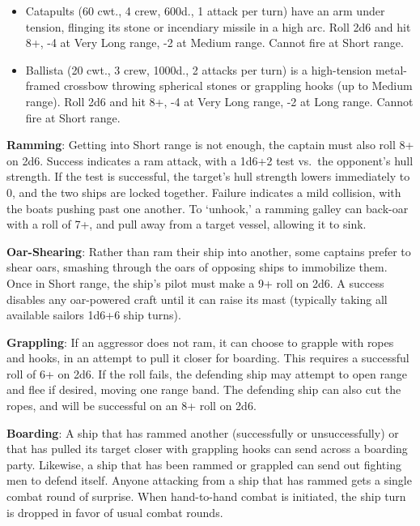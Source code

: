 \documentclass{book}
\providecommand{\tightlist}{%
\setlength{\itemsep}{0pt}\setlength{\parskip}{0pt}}
\begin{document}
\begin{itemize}
\tightlist
\item
  Catapults (60 cwt., 4 crew, 600d., 1 attack per turn) have an arm
  under tension, flinging its stone or incendiary missile in a high arc.
  Roll 2d6 and hit 8+, -4 at Very Long range, -2 at Medium range. Cannot
  fire at Short range.
\item
  Ballista (20 cwt., 3 crew, 1000d., 2 attacks per turn) is a
  high-tension metal-framed crossbow throwing spherical stones or
  grappling hooks (up to Medium range). Roll 2d6 and hit 8+, -4 at Very
  Long range, -2 at Long range. Cannot fire at Short range.
\end{itemize}

\textbf{Ramming}: Getting into Short range is not enough, the captain
must also roll 8+ on 2d6. Success indicates a ram attack, with a 1d6+2
test vs.~the opponent's hull strength. If the test is successful, the
target's hull strength lowers immediately to 0, and the two ships are
locked together. Failure indicates a mild collision, with the boats
pushing past one another. To `unhook,' a ramming galley can back-oar
with a roll of 7+, and pull away from a target vessel, allowing it to
sink.

\textbf{Oar-Shearing}: Rather than ram their ship into another, some
captains prefer to shear oars, smashing through the oars of opposing
ships to immobilize them. Once in Short range, the ship's pilot must
make a 9+ roll on 2d6. A success disables any oar-powered craft until it
can raise its mast (typically taking all available sailors 1d6+6 ship
turns).

\textbf{Grappling}: If an aggressor does not ram, it can choose to
grapple with ropes and hooks, in an attempt to pull it closer for
boarding. This requires a successful roll of 6+ on 2d6. If the roll
fails, the defending ship may attempt to open range and flee if desired,
moving one range band. The defending ship can also cut the ropes, and
will be successful on an 8+ roll on 2d6.

\textbf{Boarding}: A ship that has rammed another (successfully or
unsuccessfully) or that has pulled its target closer with grappling
hooks can send across a boarding party. Likewise, a ship that has been
rammed or grappled can send out fighting men to defend itself. Anyone
attacking from a ship that has rammed gets a single combat round of
surprise. When hand-to-hand combat is initiated, the ship turn is
dropped in favor of usual combat rounds.
\end{document}
